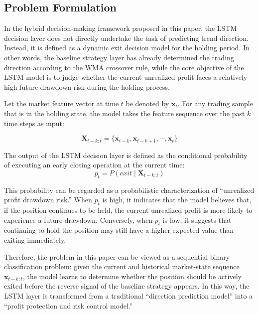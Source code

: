 \documentclass[12pt]{article}
\begin{document}
\subsection{Problem Formulation}

In the hybrid decision-making framework proposed in this paper, the LSTM decision layer does 
not directly undertake the task of predicting trend direction. Instead, it is defined as a 
dynamic exit decision model for the holding period. In other words, the baseline strategy layer 
has already determined the trading direction according to the WMA crossover rule, while the 
core objective of the LSTM model is to judge whether the current unrealized profit faces a 
relatively high future drawdown risk during the holding process.

Let the market feature vector at time $t$ be denoted by $\mathbf{x}_t$. For any trading sample 
that is in the holding state, the model takes the feature sequence over the past $k$ time steps 
as input:

\begin{equation}
    \mathbf{X}_{t-k:t} = \{\mathbf{x}_{t-k}, \mathbf{x}_{t-k+1}, \cdots, \mathbf{x}_{t}\}
\end{equation}

The output of the LSTM decision layer is defined as the conditional probability of executing 
an early closing operation at the current time:
\begin{equation}
    p_t = P(exit \mid \mathbf{X}_{t-k:t})
\end{equation}

This probability can be regarded as a probabilistic characterization of ``unrealized profit 
drawdown risk.'' When $p_t$ is high, it indicates that the model believes that, if the position 
continues to be held, the current unrealized profit is more likely to experience a future 
drawdown. Conversely, when $p_t$ is low, it suggests that continuing to hold the position may 
still have a higher expected value than exiting immediately.

Therefore, the problem in this paper can be viewed as a sequential binary classification 
problem: given the current and historical market-state sequence $\mathbf{x}_{t-k:t}$, the model 
learns to determine whether the position should be actively exited before the reverse signal of 
the baseline strategy appears. In this way, the LSTM layer is transformed from a traditional 
``direction prediction model'' into a ``profit protection and risk control model.''
\end{document}
